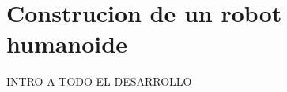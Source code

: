 \chapter{Construcion de un robot humanoide}\label{chapter:introAdesarrollo}

INTRO A TODO EL DESARROLLO




